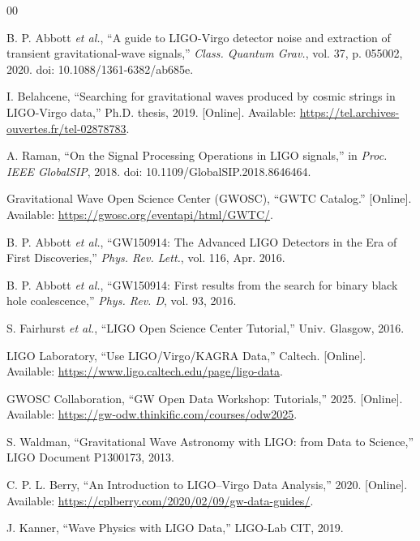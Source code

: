 \documentclass[conference]{IEEEtran}
\begin{document}
	\begin{thebibliography}{00}
		
		B. P. Abbott \textit{et al.}, ``A guide to LIGO-Virgo detector noise and extraction of transient gravitational-wave signals,'' \textit{Class. Quantum Grav.}, vol. 37, p. 055002, 2020. doi: 10.1088/1361-6382/ab685e.
		
		I. Belahcene, ``Searching for gravitational waves produced by cosmic strings in LIGO-Virgo data,'' Ph.D. thesis, 2019. [Online]. Available: \url{https://tel.archives-ouvertes.fr/tel-02878783}.
		
		A. Raman, ``On the Signal Processing Operations in LIGO signals,'' in \textit{Proc. IEEE GlobalSIP}, 2018. doi: 10.1109/GlobalSIP.2018.8646464.
		
		Gravitational Wave Open Science Center (GWOSC), ``GWTC Catalog.'' [Online]. Available: \url{https://gwosc.org/eventapi/html/GWTC/}.
		
		B. P. Abbott \textit{et al.}, ``GW150914: The Advanced LIGO Detectors in the Era of First Discoveries,'' \textit{Phys. Rev. Lett.}, vol. 116, Apr. 2016.
		
		B. P. Abbott \textit{et al.}, ``GW150914: First results from the search for binary black hole coalescence,'' \textit{Phys. Rev. D}, vol. 93, 2016. 
		
		S. Fairhurst \textit{et al.}, ``LIGO Open Science Center Tutorial,'' Univ. Glasgow, 2016. 
		
		LIGO Laboratory, ``Use LIGO/Virgo/KAGRA Data,'' Caltech. [Online]. Available: \url{https://www.ligo.caltech.edu/page/ligo-data}.
		
		GWOSC Collaboration, ``GW Open Data Workshop: Tutorials,'' 2025. [Online]. Available: \url{https://gw-odw.thinkific.com/courses/odw2025}.
		
		S. Waldman, ``Gravitational Wave Astronomy with LIGO: from Data to Science,'' LIGO Document P1300173, 2013.
		
		C. P. L. Berry, ``An Introduction to LIGO--Virgo Data Analysis,'' 2020. [Online]. Available: \url{https://cplberry.com/2020/02/09/gw-data-guides/}.
		
		J. Kanner, ``Wave Physics with LIGO Data,'' LIGO-Lab CIT, 2019.
		
	\end{thebibliography}
	
\end{document}
